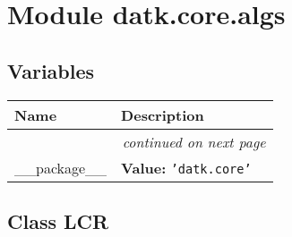 %
%
%


\section{Module datk.core.algs}

    \label{datk:core:algs}


  \subsection{Variables}

    \vspace{-1cm}
\hspace{\varindent}\begin{longtable}{|p{\varnamewidth}|p{\vardescrwidth}|l}
\cline{1-2}
\cline{1-2} \centering \textbf{Name} & \centering \textbf{Description}& \\
\cline{1-2}
\endhead\cline{1-2}\multicolumn{3}{r}{\small\textit{continued on next page}}\\\endfoot\cline{1-2}
\endlastfoot\raggedright \_\-\_\-p\-a\-c\-k\-a\-g\-e\-\_\-\_\- & \raggedright \textbf{Value:} 
{\tt \texttt{'}\texttt{datk.core}\texttt{'}}&\\
\cline{1-2}
\end{longtable}



\subsection{Class LCR}

